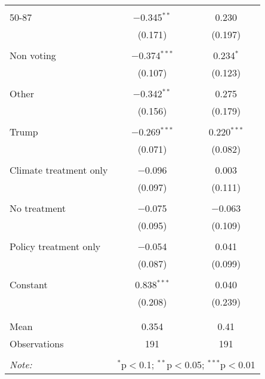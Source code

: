 \begin{tabular}{@{\extracolsep{5pt}}lcc}
  & & \\ 
 50-87 & $-$0.345$^{**}$ & 0.230 \\ 
  & (0.171) & (0.197) \\ 
  & & \\ 
 Non voting & $-$0.374$^{***}$ & 0.234$^{*}$ \\ 
  & (0.107) & (0.123) \\ 
  & & \\ 
 Other & $-$0.342$^{**}$ & 0.275 \\ 
  & (0.156) & (0.179) \\ 
  & & \\ 
 Trump & $-$0.269$^{***}$ & 0.220$^{***}$ \\ 
  & (0.071) & (0.082) \\ 
  & & \\ 
 Climate treatment only & $-$0.096 & 0.003 \\ 
  & (0.097) & (0.111) \\ 
  & & \\ 
 No treatment & $-$0.075 & $-$0.063 \\ 
  & (0.095) & (0.109) \\ 
  & & \\ 
 Policy treatment only & $-$0.054 & 0.041 \\ 
  & (0.087) & (0.099) \\ 
  & & \\ 
 Constant & 0.838$^{***}$ & 0.040 \\ 
  & (0.208) & (0.239) \\ 
  & & \\ 
\hline \\[-1.8ex] 
Mean & 0.354 & 0.41 \\ 
Observations & 191 & 191 \\ 
\hline 
\hline \\[-1.8ex] 
\textit{Note:}  & \multicolumn{2}{r}{$^{*}$p$<$0.1; $^{**}$p$<$0.05; $^{***}$p$<$0.01} \\ 
\end{tabular} 
